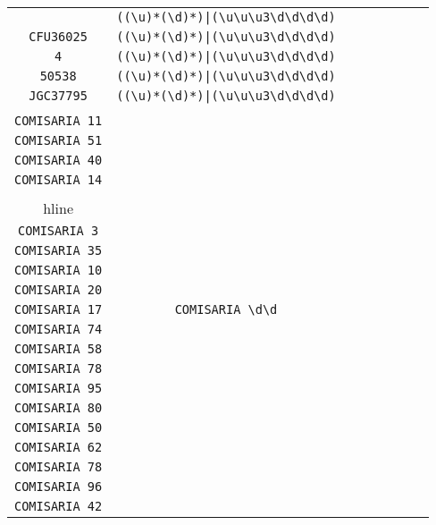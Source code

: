 \begin{longtable}{cccccccc}
\begin{tabular}{ll}
    \verb|PDOU59| & \verb.((\u)*(\d)*)|(\u\u\u3\d\d\d\d).\\
\verb|CFU36025| & \verb.((\u)*(\d)*)|(\u\u\u3\d\d\d\d).\\
\verb|4| & \verb.((\u)*(\d)*)|(\u\u\u3\d\d\d\d).\\
\verb|50538| & \verb.((\u)*(\d)*)|(\u\u\u3\d\d\d\d).\\
\verb|JGC37795| & \verb.((\u)*(\d)*)|(\u\u\u3\d\d\d\d).
\end{tabular}
\\\midrule 
\begin{tabular}{l}
    \verb|COMISARIA 52|\\
\verb|COMISARIA 11|\\
\verb|COMISARIA 51|\\
\verb|COMISARIA 40|\\
\verb|COMISARIA 14|\\
\\hline\\
\verb|COMISARIA 3|\\
\verb|COMISARIA 35|\\
\verb|COMISARIA 10|\\
\verb|COMISARIA 20|\\
\verb|COMISARIA 17|
\end{tabular}

&
\verb|COMISARIA \d\d|
&

\begin{tabular}{l}
    \verb|COMISARIA \d\d|\\
\verb|COMISARIA 74|\\
\verb|COMISARIA 58|\\
\verb|COMISARIA 78|\\
\verb|COMISARIA 95|\\
\verb|COMISARIA 80|
\end{tabular}

&

\begin{tabular}{l}
    \verb|COMISARIA \d\d|\\
\verb|COMISARIA 50|\\
\verb|COMISARIA 62|\\
\verb|COMISARIA 78|\\
\verb|COMISARIA 96|\\
\verb|COMISARIA 42|
\end{tabular}

&


\end{longtable}
